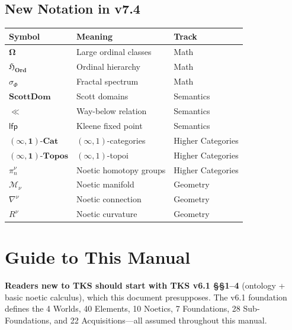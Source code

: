 \documentclass[11pt,twoside,openright]{book}
\theoremstyle{definition}
\theoremstyle{plain}
\theoremstyle{remark}
\newcommand{\Ord}{\mathbf{Ord}}              %
\newcommand{\LargeOrd}{\boldsymbol{\Omega}}          %
\newcommand{\OrdHierarchy}{\mathfrak{H}_{\Ord}}      %
\newcommand{\FractalSpectrum}{\sigma_\Phi}           %
\newcommand{\ScottDom}{\mathbf{ScottDom}}            %
\newcommand{\WayBelow}{\ll}                          %
\newcommand{\KleeneFix}{\mathsf{lfp}}                %
\newcommand{\InftyCat}{\mathbf{(\infty,1)\text{-}Cat}}  %
\newcommand{\InftyTopos}{\mathbf{(\infty,1)\text{-}Topos}} %
\newcommand{\NoeticHomotopy}{\pi^{\nu}_n}            %
\newcommand{\NoeticManifold}{\mathcal{M}_\nu}        %
\newcommand{\NoeticConnection}{\nabla^\nu}           %
\newcommand{\NoeticCurvature}{R^\nu}                 %
\begin{document}
\section*{New Notation in v7.4}

\begin{center}
\begin{tabular}{lll}
\toprule
\textbf{Symbol} & \textbf{Meaning} & \textbf{Track} \\
\midrule
$\LargeOrd$ & Large ordinal classes & Math \\
$\OrdHierarchy$ & Ordinal hierarchy & Math \\
$\FractalSpectrum$ & Fractal spectrum & Math \\
$\ScottDom$ & Scott domains & Semantics \\
$\WayBelow$ & Way-below relation & Semantics \\
$\KleeneFix$ & Kleene fixed point & Semantics \\
$\InftyCat$ & $(\infty,1)$-categories & Higher Categories \\
$\InftyTopos$ & $(\infty,1)$-topoi & Higher Categories \\
$\NoeticHomotopy$ & Noetic homotopy groups & Higher Categories \\
$\NoeticManifold$ & Noetic manifold & Geometry \\
$\NoeticConnection$ & Noetic connection & Geometry \\
$\NoeticCurvature$ & Noetic curvature & Geometry \\
\bottomrule
\end{tabular}
\end{center}

\tableofcontents


\chapter*{Guide to This Manual}

\begin{tcolorbox}[colback=blue!5!white,colframe=blue!75!black,title=\textbf{Prerequisites}]
\textbf{Readers new to TKS should start with TKS v6.1 \S\S1--4} (ontology + basic noetic calculus), which this document presupposes. The v6.1 foundation defines the 4 Worlds, 40 Elements, 10 Noetics, 7 Foundations, 28 Sub-Foundations, and 22 Acquisitions---all assumed throughout this manual.
\end{tcolorbox}
\end{document}
